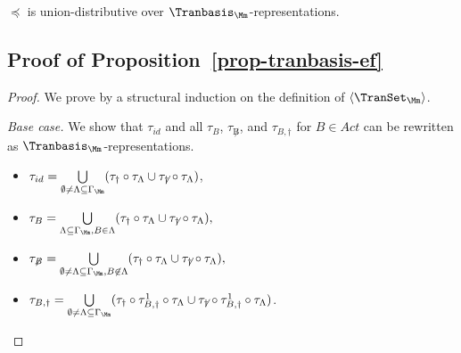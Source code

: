 \begin{proposition}\label{prop-tranbasis-udist}
$\preceq$ is union-distributive over $\Tranbasis_\Mm$-representations.
\end{proposition}


\subsection*{Proof of Proposition~\ref{prop-tranbasis-ef}}
\begin{proof}
	We prove by a structural induction on the definition of $\langle \TranSet_\Mm \rangle$.
	
	
	\smallskip
	\noindent \emph{Base case.} We show that $\tau_{id}$ and all $\tau_{B}$, $\tau_{\not B}$, and $\tau_{B, \dag}$ for $B \in Act$ can be rewritten as $\Tranbasis_\Mm$-representations.
	\begin{itemize}
	\item $\tau_{id} = \bigcup\limits_{\emptyset \neq \Lambda  \subseteq\Gamma_{\Mm}} (\tau_\dag \circ \tau_{\Lambda} \cup \tau_{{\not \dag}} \circ \tau_{\Lambda})$, 
	\item $ \tau_{B} = \bigcup\limits_{ \Lambda \subseteq\Gamma_{\Mm}, B \in \Lambda} (\tau_\dag \circ \tau_{\Lambda} \cup \tau_{{\not \dag}} \circ \tau_{\Lambda}),$
	\item	$ \tau_{\not B} =
	\bigcup\limits_{\emptyset \neq \Lambda \subseteq\Gamma_{\Mm}, B \not \in \Lambda} (\tau_\dag \circ \tau_{\Lambda} \cup \tau_{\not \dag} \circ \tau_{\Lambda}),$  
	\item $\tau_{B,\dag} = \bigcup\limits_{\emptyset \neq \Lambda \subseteq \Gamma_{\Mm}}(\tau_{\dag} \circ \tau_{B,\dag}^1\circ\tau_{\Lambda} \cup \tau_{\not \dag} \circ \tau_{B,\dag}^1\circ\tau_{\Lambda} )$.
	\end{itemize}
	

\end{proof}
